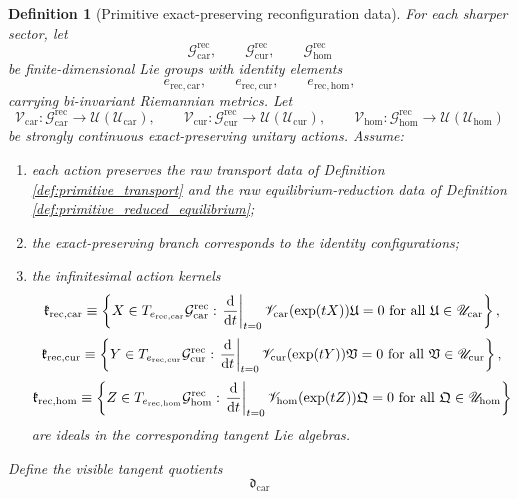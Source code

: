 \documentclass[11pt]{article}
\newcommand{\RootTensorClass}{\mathscr U_{\mathrm{car}}}
\newcommand{\RootRelabelClass}{\mathscr U_{\mathrm{cur}}}
\newcommand{\RootFreeClass}{\mathscr U_{\mathrm{hom}}}
\newcommand{\RootTensor}{\mathfrak U}
\newcommand{\RootRelabel}{\mathfrak V}
\newcommand{\RootFree}{\mathfrak Q}
\newcommand{\TensorDerAlg}{\mathfrak d_{\mathrm{car}}}
\newcommand{\TensorReconGroup}{\mathcal G_{\mathrm{car}}^{\mathrm{rec}}}
\newcommand{\CurReconGroup}{\mathcal G_{\mathrm{cur}}^{\mathrm{rec}}}
\newcommand{\HomReconGroup}{\mathcal G_{\mathrm{hom}}^{\mathrm{rec}}}
\newcommand{\TensorReconAct}{\mathscr V_{\mathrm{car}}}
\newcommand{\CurReconAct}{\mathscr V_{\mathrm{cur}}}
\newcommand{\HomReconAct}{\mathscr V_{\mathrm{hom}}}
\newtheorem{definition}{Definition}
\begin{document}
\begin{definition}[Primitive exact-preserving reconfiguration data]
\label{def:primitive_reconfiguration}
For each sharper sector, let
\[
\TensorReconGroup,\qquad
\CurReconGroup,\qquad
\HomReconGroup
\]
be finite-dimensional Lie groups with identity elements
\[
e_{\mathrm{rec,car}},\qquad
e_{\mathrm{rec,cur}},\qquad
e_{\mathrm{rec,hom}},
\]
carrying bi-invariant Riemannian metrics. Let
\[
\TensorReconAct:\TensorReconGroup\to\mathcal U(\RootTensorClass),\qquad
\CurReconAct:\CurReconGroup\to\mathcal U(\RootRelabelClass),\qquad
\HomReconAct:\HomReconGroup\to\mathcal U(\RootFreeClass)
\]
be strongly continuous exact-preserving unitary actions. Assume:
\begin{enumerate}
    \item each action preserves the raw transport data of Definition \ref{def:primitive_transport} and the raw equilibrium-reduction data of Definition \ref{def:primitive_reduced_equilibrium};
    \item the exact-preserving branch corresponds to the identity configurations;
    \item the infinitesimal action kernels
    \begin{equation}
    \mathfrak k_{\mathrm{rec,car}}
    \equiv
    \left\{
    X\in T_{e_{\mathrm{rec,car}}}\TensorReconGroup:
    \eval{\dv{}{t}}_{t=0}\TensorReconAct(\exp(tX))\RootTensor=0
    \ \text{for all }\RootTensor\in\RootTensorClass
    \right\},
    \label{eq:reconfiguration_kernel_car}
    \end{equation}
    \begin{equation}
    \mathfrak k_{\mathrm{rec,cur}}
    \equiv
    \left\{
    Y\in T_{e_{\mathrm{rec,cur}}}\CurReconGroup:
    \eval{\dv{}{t}}_{t=0}\CurReconAct(\exp(tY))\RootRelabel=0
    \ \text{for all }\RootRelabel\in\RootRelabelClass
    \right\},
    \label{eq:reconfiguration_kernel_cur}
    \end{equation}
    \begin{equation}
    \mathfrak k_{\mathrm{rec,hom}}
    \equiv
    \left\{
    Z\in T_{e_{\mathrm{rec,hom}}}\HomReconGroup:
    \eval{\dv{}{t}}_{t=0}\HomReconAct(\exp(tZ))\RootFree=0
    \ \text{for all }\RootFree\in\RootFreeClass
    \right\}
    \label{eq:reconfiguration_kernel_hom}
    \end{equation}
    are ideals in the corresponding tangent Lie algebras.
\end{enumerate}
Define the visible tangent quotients
\begin{equation}
\TensorDerAlg

\end{equation}
\end{definition}
\end{document}
